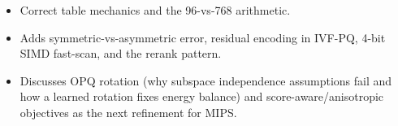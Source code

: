 \begin{interviewq}

\goodgreat
\begin{itemize}
    \item {} Correct table mechanics and the 96-vs-768 arithmetic.
    \item {} Adds symmetric-vs-asymmetric error, residual encoding in IVF-PQ, 4-bit SIMD fast-scan, and the rerank pattern.
    \item {} Discusses OPQ rotation (why subspace independence assumptions fail and how a learned rotation fixes energy balance) and score-aware/anisotropic objectives as the next refinement for MIPS.
\end{itemize}

\end{interviewq}


